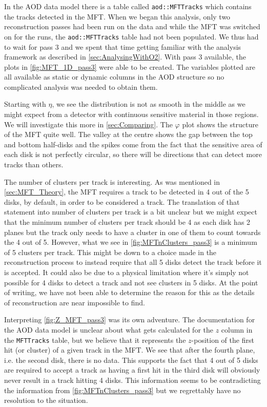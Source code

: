 In the AOD data model there is a table called \texttt{aod::MFTTracks} which contains the tracks detected in the MFT. When we began this analysis, only two reconstruction passes had been run on the data and while the MFT was switched on for the runs, the \texttt{aod::MFTTracks} table had not been populated. We thus had to wait for pass 3 and we spent that time getting familiar with the analysis framework as described in \cref{sec:AnalysingWithO2}. With pass 3 available, the plots in \cref{fig:MFT_1D_pass3} were able to be created. The variables plotted are all available as static or dynamic columns in the AOD structure so no complicated analysis was needed to obtain them. 

Starting with $\eta$, we see the distribution is not as smooth in the middle as we might expect from a detector with continuous sensitive material in those regions. We will investigate this more in \cref{sec:Comparing}. The $\varphi$ plot shows the structure of the MFT quite well. The valley at the centre shows the gap between the top and bottom half-disks and the spikes come from the fact that the sensitive area of each disk is not perfectly circular, so there will be directions that can detect more tracks than others. 

The number of clusters per track is interesting. As was mentioned in \cref{sec:MFT_Theory}, the MFT requires a track to be detected in 4 out of the 5 disks, by default, in order to be considered a track. The translation of that statement into number of clusters per track is a bit unclear but we might expect that the minimum number of clusters per track should be 4 as each disk has 2 planes but the track only needs to have a cluster in one of them to count towards the 4 out of 5. However, what we see in \cref{fig:MFTnClusters_pass3} is a minimum of 5 clusters per track. This might be down to a choice made in the reconstruction process to instead require that all 5 disks detect the track before it is accepted. It could also be due to a physical limitation where it's simply not possible for 4 disks to detect a track and not see clusters in 5 disks. At the point of writing, we have not been able to determine the reason for this as the details of reconstruction are near impossible to find.

Interpreting \cref{fig:Z_MFT_pass3} was its own adventure. The documentation for the AOD data model is unclear about what gets calculated for the $z$ column in the \texttt{MFTTracks} table, but we believe that it represents the $z$-position of the first hit (or cluster) of a given track in the MFT. We see that after the fourth plane, i.e. the second disk, there is no data. This supports the fact that 4 out of 5 disks are required to accept a track as having a first hit in the third disk will obviously never result in a track hitting 4 disks. This information seems to be contradicting the information from \cref{fig:MFTnClusters_pass3} but we regrettably have no resolution to the situation.

